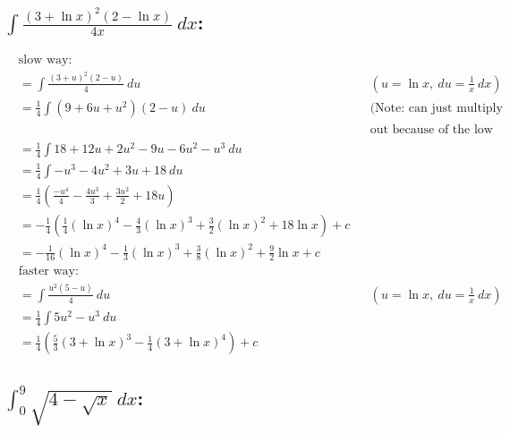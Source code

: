 \documentclass[MathsNotesBase.tex]{subfiles}
\begin{document}
  
  \subsection*{$\int{\frac{(3 + \ln{x})^2(2 - \ln{x})}{4x}\ dx}$:}
   
  \begin{align*}
      &\text{slow way:}\\
      &= \int{\frac{(3 + u)^2(2 - u)}{4}\ du} &&(u = \ln{x},\ du = \frac{1}{x}\ dx) \\[8pt]
      &= \frac{1}{4}\int{(9 + 6u + u^2)(2 - u)\ du} && (\text{Note: can just multiply this} \\
      &&&\text{out because of the low power)} \\[8pt]
      &= \frac{1}{4}\int{18 + 12u + 2u^2 - 9u - 6u^2 - u^3\ du} && \\[8pt]
      &= \frac{1}{4}\int{-u^3 - 4u^2 + 3u + 18\ du} && \\[8pt]
      &= \frac{1}{4}\left(\frac{-u^4}{4} - \frac{4u^3}{3} + \frac{3u^2}{2} + 18u\right) && \\[8pt]
      &= -\frac{1}{4}\left(\frac{1}{4}(\ln{x})^4 - \frac{4}{3}(\ln{x})^3 + \frac{3}{2}(\ln{x})^2 + 18\ln{x}\right) + c && \\[8pt]
      &= -\frac{1}{16}(\ln{x})^4 - \frac{1}{3}(\ln{x})^3 + \frac{3}{8}(\ln{x})^2 + \frac{9}{2}\ln{x} + c && \\[8pt]
      &\text{faster way:}\\
      &= \int{\frac{u^2(5 - u)}{4}\ du} && (u = \ln{x},\ du = \frac{1}{x}\ dx)\\[8pt]
      &= \frac{1}{4}\int{5u^2 - u^3\ du}\\[8pt]
      &= \frac{1}{4}\left(\frac{5}{3}(3 + \ln{x})^3 - \frac{1}{4}(3 + \ln{x})^4\right) + c
  \end{align*}
  
  
  \subsection*{$\int_0^9{\sqrt{4 - \sqrt{x}}}\ dx$:}
   
\end{document}
